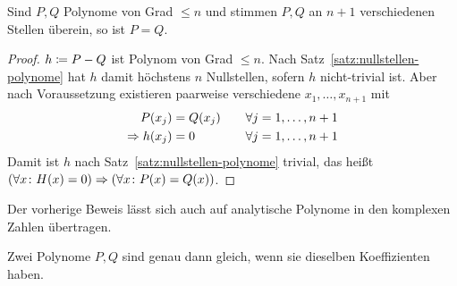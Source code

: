 \begin{korollar}
    Sind $P,Q$ Polynome von Grad $\leq n$ und stimmen $P,Q$ an $n+1$ verschiedenen Stellen überein, so ist $P=Q$.

    \begin{proof}
        $h\coloneqq P-Q$ ist Polynom von Grad $\leq n$. Nach Satz~\ref{satz:nullstellen-polynome} hat $h$ damit höchstens $n$ Nullstellen, sofern $h$ nicht-trivial ist. Aber nach Voraussetzung existieren paarweise verschiedene $x_1,\dots, x_{n+1}$ mit
        \begin{alignat*}{2}
            P(x_j) &= Q(x_j)\quad&\forall j=1,\dots,n+1\\
            \Rightarrow{} h(x_j) &= 0\quad&\forall j=1,\dots,n+1
        \end{alignat*}
        Damit ist $h$ nach Satz~\ref{satz:nullstellen-polynome} trivial, das heißt $(\forall x\colon H(x) = 0) \Rightarrow{} (\forall x\colon P(x)=Q(x))$.
    \end{proof}
\end{korollar}

\begin{bemerkung}
    Der vorherige Beweis lässt sich auch auf analytische Polynome in den komplexen Zahlen übertragen.
\end{bemerkung}

\begin{korollar}[Koeffizientenvergleich]
    Zwei Polynome $P,Q$ sind genau dann gleich, wenn sie dieselben Koeffizienten haben.
\end{korollar}

\newpage